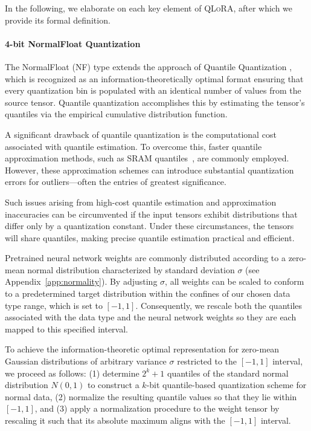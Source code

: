 In the following, we elaborate on each key element of \textsc{QLoRA}, after which we provide its formal definition.

\paragraph{4-bit NormalFloat Quantization} The NormalFloat (NF) type extends the approach of Quantile Quantization \citep{dettmers2022optimizers}, which is recognized as an information-theoretically optimal format ensuring that every quantization bin is populated with an identical number of values from the source tensor. Quantile quantization accomplishes this by estimating the tensor's quantiles via the empirical cumulative distribution function.

A significant drawback of quantile quantization is the computational cost associated with quantile estimation. To overcome this, faster quantile approximation methods, such as SRAM quantiles~\citep{dettmers2022optimizers}, are commonly employed. However, these approximation schemes can introduce substantial quantization errors for outliers—often the entries of greatest significance.

Such issues arising from high-cost quantile estimation and approximation inaccuracies can be circumvented if the input tensors exhibit distributions that differ only by a quantization constant. Under these circumstances, the tensors will share quantiles, making precise quantile estimation practical and efficient.

Pretrained neural network weights are commonly distributed according to a zero-mean normal distribution characterized by standard deviation $\sigma$ (see Appendix~\ref{app:normality}). By adjusting $\sigma$, all weights can be scaled to conform to a predetermined target distribution within the confines of our chosen data type range, which is set to $[-1, 1]$. Consequently, we rescale both the quantiles associated with the data type and the neural network weights so they are each mapped to this specified interval.

To achieve the information-theoretic optimal representation for zero-mean Gaussian distributions of arbitrary variance $\sigma$ restricted to the $[-1, 1]$ interval, we proceed as follows: (1) determine $2^k+1$ quantiles of the standard normal distribution $N(0, 1)$ to construct a $k$-bit quantile-based quantization scheme for normal data, (2) normalize the resulting quantile values so that they lie within $[-1, 1]$, and (3) apply a normalization procedure to the weight tensor by rescaling it such that its absolute maximum aligns with the $[-1, 1]$ interval.


